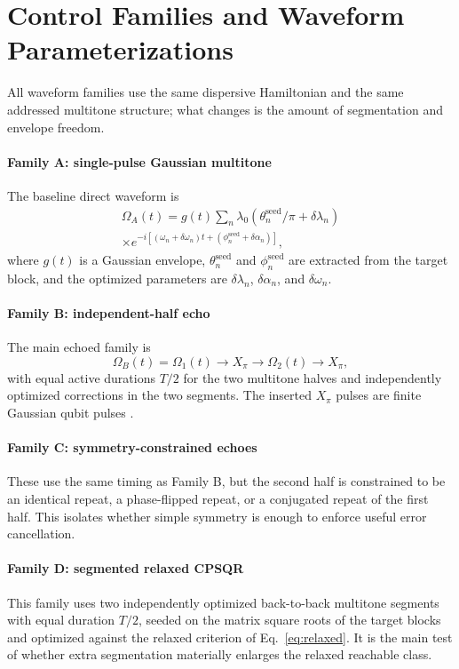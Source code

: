 \documentclass[aps,pra,twocolumn,reprint,floatfix,amsmath,amssymb]{revtex4-2}
\begin{document}
\section{Control Families and Waveform Parameterizations}
All waveform families use the same dispersive Hamiltonian and the same addressed multitone structure; what changes is the amount of segmentation and envelope freedom.

\paragraph*{Family A: single-pulse Gaussian multitone}
The baseline direct waveform is
\begin{multline}
\Omega_A(t)
=
g(t)\sum_n \lambda_0
\left(\theta_n^{\mathrm{seed}}/\pi + \delta\lambda_n \right)
\\ \times
e^{-i[(\omega_n + \delta\omega_n)t + (\phi_n^{\mathrm{seed}} + \delta\alpha_n)]},
\end{multline}
where $g(t)$ is a Gaussian envelope, $\theta_n^{\mathrm{seed}}$ and $\phi_n^{\mathrm{seed}}$ are extracted from the target block, and the optimized parameters are $\delta\lambda_n$, $\delta\alpha_n$, and $\delta\omega_n$.

\paragraph*{Family B: independent-half echo}
The main echoed family is
\begin{equation}
\Omega_B(t) = \Omega_1(t)\rightarrow X_\pi \rightarrow \Omega_2(t)\rightarrow X_\pi,
\end{equation}
with equal active durations $T/2$ for the two multitone halves and independently optimized corrections in the two segments.  The inserted $X_\pi$ pulses are finite Gaussian qubit pulses \cite{hahn1950echo}.

\paragraph*{Family C: symmetry-constrained echoes}
These use the same timing as Family B, but the second half is constrained to be an identical repeat, a phase-flipped repeat, or a conjugated repeat of the first half.  This isolates whether simple symmetry is enough to enforce useful error cancellation.

\paragraph*{Family D: segmented relaxed CPSQR}
This family uses two independently optimized back-to-back multitone segments with equal duration $T/2$, seeded on the matrix square roots of the target blocks and optimized against the relaxed criterion of Eq.~\eqref{eq:relaxed}.  It is the main test of whether extra segmentation materially enlarges the relaxed reachable class.
\end{document}
